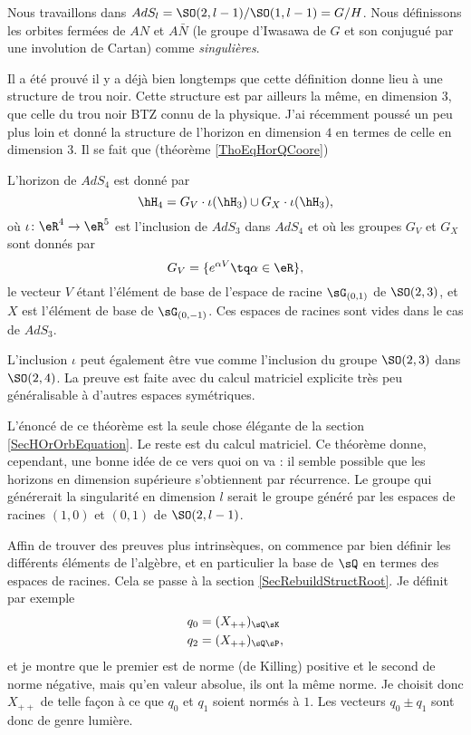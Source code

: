 Nous travaillons dans $AdS_l=\SO(2,l-1)/\SO(1,l-1)=G/H$. Nous définissons les orbites fermées de $AN$ et $A\bar N$ (le groupe d'Iwasawa de $G$ et son conjugué par une involution de Cartan) comme \emph{singulières}.

Il a été prouvé il y a déjà bien longtemps que cette définition donne lieu à une structure de trou noir. Cette structure est par ailleurs la même, en dimension 3, que celle du trou noir BTZ connu de la physique. J'ai récemment poussé un peu plus loin et donné la structure de l'horizon en dimension $4$ en termes de celle en dimension $3$. Il se fait que (théorème \ref{ThoEqHorQCoore})

\begin{theorem}
L'horizon de $AdS_4$ est donné par
\begin{equation}		
	\hH_4=G_V\cdot \iota(\hH_3)\cup G_X\cdot\iota(\hH_3),
\end{equation}
où $\iota\colon \eR^4\to \eR^5$ est l'inclusion de $AdS_3$ dans $AdS_4$ et où les groupes $G_V$ et $G_X$ sont donnés par
\begin{equation}
	G_V=\{  e^{\alpha V}\tq\alpha\in\eR \},
\end{equation}
le vecteur $V$ étant l'élément de base de l'espace de racine $\sG_{(0,1)}$ de $\SO(2,3)$, et $X$ est l'élément de base de $\sG_{(0,-1)}$. Ces espaces de racines sont vides dans le cas de $AdS_3$.
\end{theorem}
L'inclusion $\iota$ peut également être vue comme l'inclusion du groupe $\SO(2,3)$ dans $\SO(2,4)$. La preuve est faite avec du calcul matriciel explicite très peu généralisable à d'autres espaces symétriques.

L'énoncé de ce théorème est la seule chose élégante de la section \ref{SecHOrOrbEquation}. Le reste est du calcul matriciel. Ce théorème donne, cependant, une bonne idée de ce vers quoi on va : il semble possible que les horizons en dimension supérieure s'obtiennent par récurrence. Le groupe qui générerait la singularité en dimension $l$ serait le groupe généré par les espaces de racines $(1,0)$ et $(0,1)$ de $\SO(2,l-1)$.

Affin de trouver des preuves plus intrinsèques, on commence par bien définir les différents éléments de l'algèbre, et en particulier la base de $\sQ$ en termes des espaces de racines. Cela se passe à la section \ref{SecRebuildStructRoot}. Je définit par exemple
\begin{equation}
	\begin{aligned}[]
		q_0&=(X_{++})_{\sQ\sK}\\
		q_2&=(X_{++})_{\sQ\sP},
	\end{aligned}
\end{equation}
et je montre que le premier est de norme (de Killing) positive et le second de norme négative, mais qu'en valeur absolue, ils ont la même norme. Je choisit donc $X_{++}$ de telle façon à ce que $q_0$ et $q_1$ soient normés à $1$. Les vecteurs $q_0\pm q_1$ sont donc de genre lumière.

